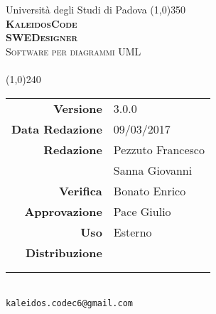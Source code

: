 \documentclass[a4paper,12pt]{article}
\author{KaleidosCode}
\date{09/03/2017}	%
\begin{document}
	\begin{titlepage}
		\centering Università degli Studi di Padova
		\line(1,0){350}\\
		\vspace{0.4cm}
		{\bfseries\scshape\LARGE KaleidosCode\\}
		\vspace{0.4cm}
		{\bfseries\scshape\LARGE SWEDesigner\\}
		{\scshape\Large Software per diagrammi UML\\}
		\vspace{1cm}
		{\scshape\Large \pianodiqualificai\ \\}		%
		\vspace{1.4cm}
		\logo
		\vspace{1.2cm}
		\line(1,0){240}\\
		\begin{tabular}{r|l}
			{\hfill \textbf{Versione}} 			& 3.0.0\\
			{\hfill \textbf{Data Redazione}} 	& 09/03/2017\\	%
			{\hfill \textbf{Redazione}} 		& Pezzuto Francesco\\ & Sanna Giovanni\\	%
			{\hfill \textbf{Verifica}} 			& Bonato Enrico\\	%
			{\hfill \textbf{Approvazione}} 		& Pace Giulio\\	%
			{\hfill \textbf{Uso}} 				& Esterno\\
			{\hfill \textbf{Distribuzione}} 	& \vardanega \\ & \cardin \\ & \proponente\\
		\end{tabular}\\
		\vspace{2cm}
		\texttt{kaleidos.codec6@gmail.com}
	\end{titlepage}
	
	\pagestyle{myfront} 
	\newpage
	
	\newpage
	\tableofcontents
	\newpage
	\listoftables
	\newpage
	\listoffigures
	\newpage
	\pagestyle{mymain}
	
	\newpage
	
	\newpage
	
	\newpage
	
	\appendix
	\newpage
	
	\newpage
	
	
	\label{LastPage}
\end{document}
